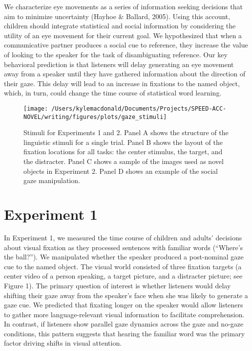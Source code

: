 \documentclass[10pt, letterpaper]{article}
\newenvironment{CodeChunk}{}{}
\begin{document}
We characterize eye movements as a series of information seeking
decisions that aim to minimize uncertainty (Hayhoe \& Ballard, 2005).
Using this account, children should integrate statistical and social
information by considering the utility of an eye movement for their
current goal. We hypothesized that when a communicative partner produces
a social cue to reference, they increase the value of looking to the
speaker for the task of disambiguating reference. Our key behavioral
prediction is that listeners will delay generating an eye movement away
from a speaker until they have gathered information about the direction
of their gaze. This delay will lead to an increase in fixations to the
named object, which, in turn, could change the time course of
statistical word learning.

\begin{CodeChunk}
\begin{figure*}[h]

{\centering \texttt{[image: /Users/kylemacdonald/Documents/Projects/SPEED-ACC-NOVEL/writing/figures/plots/gaze\_stimuli]} 

}

\caption[Stimuli for Experiments 1 and 2]{Stimuli for Experiments 1 and 2. Panel A shows the structure of the linguistic stimuli for a single trial. Panel B shows the layout of the fixation locations for all tasks: the center stimulus, the target, and the distracter. Panel C shows a sample of the images used as novel objects in Experiment 2. Panel D shows an example of the social gaze manipulation.}\label{fig:gaze-stimuli}
\end{figure*}
\end{CodeChunk}

\hypertarget{experiment-1}{%
\section{Experiment 1}\label{experiment-1}}

In Experiment 1, we measured the time course of children and adults'
decisions about visual fixation as they processed sentences with
familiar words (``Where's the ball?''). We manipulated whether the
speaker produced a post-nominal gaze cue to the named object. The visual
world consisted of three fixation targets (a center video of a person
speaking, a target picture, and a distracter picture; see Figure 1). The
primary question of interest is whether listeners would delay shifting
their gaze away from the speaker's face when she was likely to generate
a gaze cue. We predicted that fixating longer on the speaker would allow
listeners to gather more language-relevant visual information to
facilitate comprehension. In contrast, if listeners show parallel gaze
dynamics across the gaze and no-gaze conditions, this pattern suggests
that hearing the familiar word was the primary factor driving shifts in
visual attention.
\end{document}
